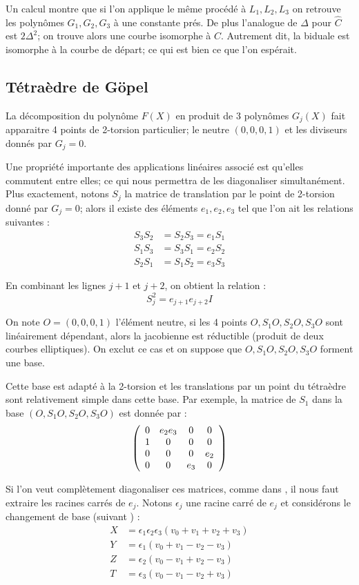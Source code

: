 \documentclass[a4paper]{article}
\theoremstyle{definition}
\theoremstyle{remark}
\numberwithin{equation}{section}
\begin{document}
Un calcul montre que si l'on applique le même procédé à $L_1,L_2,L_3$ on retrouve les polynômes $G_1,G_2,G_3$ à une constante prés. De plus l'analogue de $\Delta$ pour $\hat{C}$ est $2\Delta^2$; on trouve alors une courbe isomorphe à $C$. Autrement dit, la biduale est isomorphe à la courbe de départ; ce qui est bien ce que l'on espérait.

\subsection{Tétraèdre de G\"opel}
La décomposition du polynôme $F(X)$ en produit de 3 polynômes $G_j(X)$ fait apparaitre 4 points de 2-torsion particulier; le neutre $(0,0,0,1)$ et les diviseurs donnés par $G_j=0$.

Une propriété importante des applications linéaires associé est qu'elles commutent entre elles; ce qui nous permettra de les diagonaliser simultanément. Plus exactement, notons $S_j$ la matrice de translation par le point de 2-torsion donné par $G_j=0$; alors il existe des éléments $e_1,e_2,e_3$ tel que l'on ait les relations suivantes :
\begin{align}
S_3S_2 &= S_2S_3 = e_1S_1 \\
S_1S_3 &= S_3S_1 = e_2S_2 \\
S_2S_1 &= S_1S_2 = e_3S_3
\end{align}

En combinant les lignes $j+1$ et $j+2$, on obtient la relation :
$$S_j^2 = e_{j+1}e_{j+2}I$$

On note $O=(0,0,0,1)$ l'élément neutre, si les 4 points $O,S_1O,S_2O,S_3O$ sont linéairement dépendant, alors la jacobienne est réductible (produit de deux courbes elliptiques). On exclut ce cas et on suppose que $O,S_1O,S_2O,S_3O$ forment une base.

Cette base est adapté à la 2-torsion et les translations par un point du tétraèdre sont relativement simple dans cette base. Par exemple, la matrice de $S_1$ dans la base  $(O,S_1O,S_2O,S_3O)$ est donnée par :
\[ \left(
  \begin{array}{ c c c c}
     0 & e_2e_3 & 0 	& 0		\\
     1 & 0 		& 0 	& 0		\\
     0 & 0 		& 0 	& e_2	\\
     0 & 0 		& e_3 	& 0		\\
  \end{array} \right)
\]

Si l'on veut complètement diagonaliser ces matrices, comme dans \citep{gaudry}, il nous faut extraire les racines carrés de $e_j$. Notons $\epsilon_j$ une racine carré de $e_j$ et considérons le changement de base (suivant \citet{cassels-Flynn}) :
\begin{align}
\label{chgBase}
X &= \epsilon_1\epsilon_2\epsilon_3(v_0+v_1+v_2+v_3) \\
Y &= \epsilon_1(v_0+v_1-v_2-v_3) \\
Z &= \epsilon_2(v_0-v_1+v_2-v_3) \\
T &= \epsilon_3(v_0-v_1-v_2+v_3)
\end{align}
\end{document}
